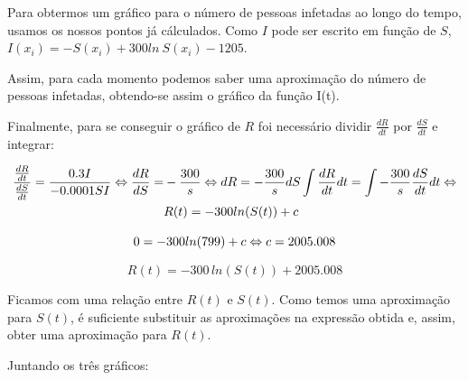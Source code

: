 \documentclass[portuguese, a4paper]{article}
\begin{document}
		\par
		Para obtermos um gráfico para o número de pessoas infetadas ao longo do
		tempo, usamos os nossos pontos já cálculados. Como $I$ pode ser escrito
		em função de $S$, $I(x_i) = -S(x_i) + 300ln~S(x_i) - 1205$.

		\par
		Assim, para cada momento podemos saber uma aproximação do número de
		pessoas infetadas, obtendo-se assim	o gráfico da função I(t).

		\par \null \par
		Finalmente, para se conseguir o gráfico de $R$ foi necessário
		dividir $\frac{dR}{dt}$ por $\frac{dS}{dt}$ e integrar:

		\begin{equation}
		\begin{split}
			\frac{\frac{dR}{dt}}{\frac{dS}{dt}} = \frac{0.3 I}{-0.0001 S I}
			\Leftrightarrow
			\frac{dR}{dS} = &-\frac{300}{s} \Leftrightarrow dR =
			-\frac{300}{s} dS
			\int \frac{dR}{dt}dt = \int -\frac{300}{s} \frac{dS}{dt}dt
			\Leftrightarrow \\ \newline
			& R(t) = -300 ln(S(t)) + c
		\end{split}
		\end{equation}

		\begin{equation}
			0 = -300 ln(799) + c \Leftrightarrow \\
			c = 2005.008 \\
		\end{equation}

		\begin{equation}
			R(t) = -300\, ln(S(t)) + 2005.008
		\end{equation}

		\par
		Ficamos com uma relação entre $R(t)$ e $S(t)$. Como temos uma
		aproximação para $S(t)$, é suficiente substituir as aproximações na
		expressão obtida e, assim, obter uma aproximação para $R(t)$.

		\par
		Juntando os três gráficos:
\end{document}
